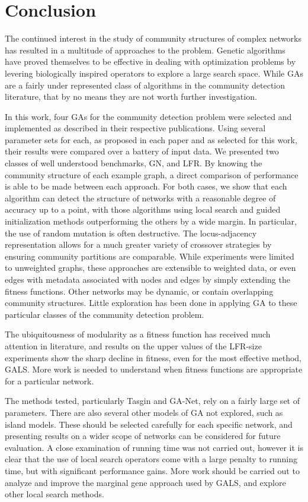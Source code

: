 \chapter{Conclusion}
\label{ch:conclusion}

The continued interest in the study of community structures of complex networks has resulted in a multitude of approaches to the problem. Genetic algorithms have proved themselves to be effective in dealing with optimization problems by levering biologically inspired operators to explore a large search space. While GAs are a fairly under represented class of algorithms in the community detection literature, that by no means they are not worth further investigation.

In this work, four GAs for the community detection problem were selected and implemented as described in their respective publications. Using several parameter sets for each, as proposed in each paper and as selected for this work, their results were compared over a battery of input data.
We presented two classes of well understood benchmarks, GN, and LFR. By knowing the community structure of each example graph, a direct comparison of performance is able to be made between each approach. For both cases, we show that each algorithm can detect the structure of networks with a reasonable degree of accuracy up to a point, with those algorithms using local search and guided initialization methods outperforming the others by a wide margin. In particular, the use of random mutation is often destructive. The locus-adjacency representation allows for a much greater variety of crossover strategies by ensuring community partitions are comparable. While experiments were limited to unweighted graphs, these approaches are extensible to weighted data, or even edges with metadata associated with nodes and edges by simply extending the fitness functions. Other networks may be dynamic, or contain overlapping community structures. Little exploration has been done in applying GA to these particular classes of the community detection problem.

The ubiquitousness of modularity as a fitness function has received much attention in literature, and results on the upper values of the LFR-size experiments show the sharp decline in fitness, even for the most effective method, GALS. More work is needed to understand when fitness functions are appropriate for a particular network\cite{Kaur2016}.

The methods tested, particularly Tasgin and GA-Net, rely on a fairly large set of parameters. There are also several other models of GA not explored, such as island models. These should be selected carefully for each specific network, and presenting results on a wider scope of networks can be considered for future evaluation. A close examination of running time was not carried out, however it is clear that the use of local search operators come with a large penalty to running time, but with significant performance gains. More work should be carried out to analyze and improve the marginal gene approach used by GALS, and explore other local search methods.